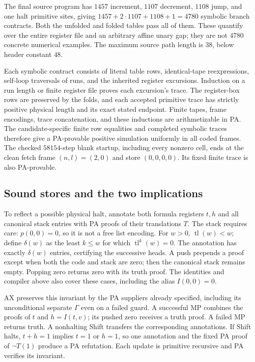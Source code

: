 The final source program has $1457$ increment, $1107$ decrement, $1108$ jump,
and one halt primitive sites, giving
$1457+2\cdot1107+1108+1=4780$ symbolic branch contracts.
Both the unfolded and folded tables pass all of them. These quantify
over the entire register file and an arbitrary affine unary gap;
they are not $4780$ concrete numerical examples. The maximum source
path length is $38$, below header constant $48$.

Each symbolic contract consists of literal table rows, identical-tape
reexpressions, self-loop traversals of runs, and the inherited
register excursions. Induction on a run length or finite register
file proves each excursion's trace. The register-box rows are
preserved by the folds, and each accepted primitive trace has
strictly positive physical length and its exact stated endpoint.
Finite tapes, frame encodings, trace concatenation, and these
inductions are arithmetizable in PA. The candidate-specific finite
row equalities and completed symbolic traces therefore give a
PA-provable positive simulation uniformly in all coded frames.
The checked $58154$-step blank startup, including every nonzero
cell, ends at the clean fetch frame $(n,l)=(2,0)$ and store
$(0,0,0,0)$. Its fixed finite trace is also PA-provable.

\subsection{Sound stores and the two implications}

To reflect a possible physical halt, annotate both formula registers
$t,h$ and all canonical stack entries with PA proofs of their
translations $T$. The stack requires care: $p(0,0)=0$, so it is not
a free list encoding. For $w>0$, $\operatorname{tl}(w)<w$; define
$\delta(w)$ as the least $k\le w$ for which
$\operatorname{tl}^{k}(w)=0$. The annotation has exactly
$\delta(w)$ entries, certifying the successive heads. A push
prepends a proof except when both the code and stack are zero;
then the canonical stack remains empty. Popping zero returns zero
with its truth proof. The identities and compiler above also cover
these cases, including the alias $I(0,0)=0$.

AX preserves this invariant by the PA suppliers already specified,
including its unconditional separate $\Gamma$ even on a failed
guard. A successful MP combines the proofs of $t$ and $h=I(t,v)$;
its pushed zero receives a truth proof. A failed MP returns truth.
A nonhalting Shift transfers the corresponding annotations.
If Shift halts, $t+h=1$ implies $t=1$ or $h=1$, so one annotation
and the fixed PA proof of $\neg T(1)$ produce a PA refutation.
Each update is primitive recursive and PA verifies its invariant.

